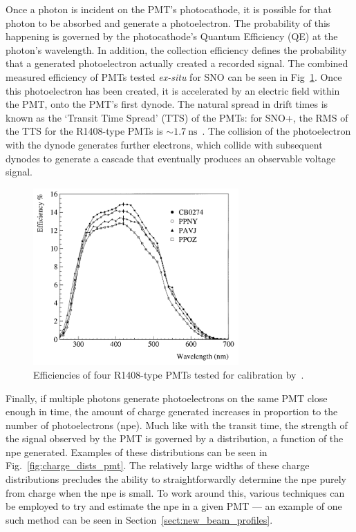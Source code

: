 Once a photon is incident on the PMT's photocathode, it is possible for that photon to be absorbed and generate a photoelectron. The probability of this happening is governed by the photocathode's Quantum Efficiency (QE) at the photon's wavelength. In addition, the collection efficiency defines the probability that a generated photoelectron actually created a recorded signal. The combined measured efficiency of PMTs tested \textit{ex-situ} for SNO can be seen in Fig~\ref{fig:qe_pmts}. Once this photoelectron has been created, it is accelerated by an electric field within the PMT, onto the PMT's first dynode. The natural spread in drift times is known as the `Transit Time Spread' (TTS) of the PMTs: for SNO+, the RMS of the TTS for the R1408-type PMTs is $\sim\SI{1.7}{\ns}$~\cite{BOGER2000172}. %
The collision of the photoelectron with the dynode generates further electrons, which collide with subsequent dynodes to generate a cascade that eventually produces an observable voltage signal.

\begin{figure}
    \centering
    \includegraphics[width=0.7\textwidth]{2_Detector/Figs/efficiencies_PMTs_biller1999.png}
    \caption[Efficiencies of the R1408-type PMTs used as standard within SNO+]
    {Efficiencies of four R1408-type PMTs tested for calibration by~\cite{billerMeasurementsPhotomultiplierSingle1999}. %
    }
    \label{fig:qe_pmts}
\end{figure}

Finally, if multiple photons generate photoelectrons on the same PMT close enough in time, the amount of charge generated increases in proportion to the number of photoelectrons (npe). Much like with the transit time, the strength of the signal observed by the PMT is governed by a distribution, a function of the npe generated. Examples of these distributions can be seen in Fig.~\ref{fig:charge_dists_pmt}. %
The relatively large widths of these charge distributions precludes the ability to straightforwardly determine the npe purely from charge when the npe is small. To work around this, various techniques can be employed to try and estimate the npe in a given PMT --- an example of one such method can be seen in Section~\ref{sect:new_beam_profiles}.

